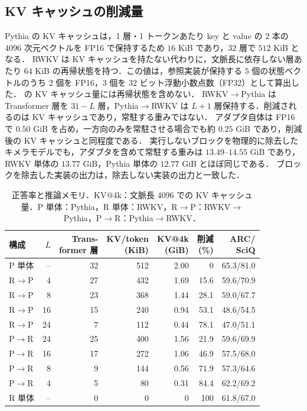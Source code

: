 \documentclass[techrep,noauthor]{ipsj}
\newcommand{\RtoP}{RWKV$\to$\allowbreak Pythia}
\newcommand{\PtoR}{Pythia$\to$\allowbreak RWKV}
\begin{document}
\subsection{KV キャッシュの削減量}\label{sec:kv}
Pythia の KV キャッシュは，1 層・1 トークンあたり key と value の 2 本の $4096$ 次元ベクトルを FP16 で保持するため $16$ KiB であり，$32$ 層で $512$ KiB となる．
RWKV は KV キャッシュを持たない代わりに，文脈長に依存しない層あたり $64$ KiB の再帰状態を持つ．この値は，参照実装が保持する
$5$ 個の状態ベクトルのうち $2$ 個を FP16，$3$ 個を 32 ビット浮動小数点数（FP32）として算出した． の KV キャッシュ量には再帰状態を含めない．
\RtoP{} は Transformer 層を $31{-}L$ 層，\PtoR{} は $L{+}1$ 層保持する．削減されるのは KV キャッシュであり，常駐する重みではない．
アダプタ自体は FP16 で $0.50$ GiB を占め，一方向のみを常駐させる場合でも約 $0.25$ GiB であり，削減後の KV キャッシュと同程度である．
実行しないブロックを物理的に除去したキメラモデルでも，アダプタを含めて常駐する重みは $13.49$--$14.55$ GiB であり，RWKV 単体の $13.77$ GiB，Pythia 単体の $12.77$ GiB とほぼ同じである．
ブロックを除去した実装の出力は，除去しない実装の出力と一致した．

\begin{table}[!t]\centering\small
\caption{正答率と推論メモリ．KV@4k：文脈長 $4096$ での KV キャッシュ量．P 単体：Pythia，R 単体：RWKV，R$\to$P：RWKV$\to$Pythia，P$\to$R：Pythia$\to$RWKV．}\label{tab:kv}
\setlength{\tabcolsep}{2.4pt}
{
\begin{tabular}{lrrrrrr}\toprule
構成 & $L$ & \shortstack{Trans-\\former 層} & \shortstack{KV/token\\(KiB)} & \shortstack{KV@4k\\(GiB)} & \shortstack{削減\\(\%)} & \shortstack{ARC/\\SciQ}\\\midrule
P 単体 & -- & 32 & 512 & 2.00 & 0 & 65.3/81.0\\
R$\to$P & 4  & 27 & 432 & 1.69 & 15.6 & 59.6/70.9\\
R$\to$P & 8  & 23 & 368 & 1.44 & 28.1 & 59.0/67.7\\
R$\to$P & 16 & 15 & 240 & 0.94 & 53.1 & 48.6/54.5\\
R$\to$P & 24 &  7 & 112 & 0.44 & 78.1 & 47.0/51.1\\
P$\to$R & 24 & 25 & 400 & 1.56 & 21.9 & 59.6/69.9\\
P$\to$R & 16 & 17 & 272 & 1.06 & 46.9 & 57.5/68.0\\
P$\to$R & 8  &  9 & 144 & 0.56 & 71.9 & 57.3/64.6\\
P$\to$R & 4 &  5 &  80 & 0.31 & 84.4 & 62.2/69.2\\
R 単体 & -- & 0 & 0 & 0 & 100 & 61.8/67.0\\\bottomrule
\end{tabular}}
\end{table}
\end{document}
